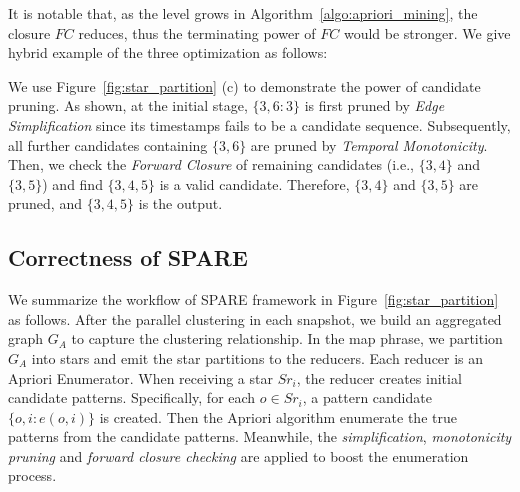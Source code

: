 It is notable that, as the level grows in Algorithm~\ref{algo:apriori_mining}, the closure $FC$
reduces, thus the terminating power of $FC$ would be stronger. We give hybrid example of the three
optimization as follows:
%

\begin{example}
We use Figure~\ref{fig:star_partition} (c) to 
demonstrate the power of candidate pruning. 
As shown, at the initial stage, $\{3,6:3\}$ is first pruned by \textit{Edge Simplification} since its
timestamps fails to be a candidate sequence. Subsequently, all further candidates containing $\{3,6\}$ 
are pruned by \textit{Temporal Monotonicity}. Then, we check the \textit{Forward Closure} 
of remaining candidates (i.e., $\{3,4\}$ and $\{3,5\}$) and find $\{3,4,5\}$ is a
valid candidate. Therefore, $\{3,4\}$ and $\{3,5\}$ are pruned, and $\{3,4,5\}$ is the output.
\end{example}






\subsection{Correctness of SPARE}
We summarize the workflow of SPARE framework in Figure~\ref{fig:star_partition} as follows. After the parallel clustering in each snapshot, we build an aggregated graph $G_A$ to capture the clustering relationship. In the map phrase, we partition $G_A$ into stars and emit the star partitions to the reducers. Each reducer is an Apriori Enumerator. When receiving a star $Sr_i$, the reducer creates initial candidate patterns. Specifically, for each $o \in Sr_i$, a pattern candidate $\{o,i: e(o,i)\}$ is created. Then the Apriori algorithm enumerate the true patterns from the candidate patterns. Meanwhile, the \emph{simplification}, \emph{monotonicity pruning} and \emph{forward closure checking} are applied to boost the enumeration process.


